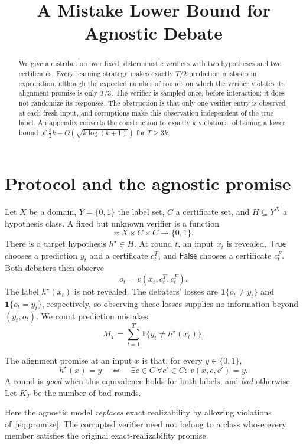 \documentclass[11pt]{article}
\title{A Mistake Lower Bound for Agnostic Debate}
\author{}
\date{}
\newcommand{\ind}{\mathbf{1}}
\newcommand{\True}{\mathsf{True}}
\newcommand{\False}{\mathsf{False}}
\theoremstyle{remark}
\begin{document}
\maketitle
\thispagestyle{plain}
\vspace{-2.2em}
\begin{abstract}
We give a distribution over fixed, deterministic verifiers with two hypotheses
and two certificates. Every learning strategy makes exactly $T/2$ prediction
mistakes in expectation, although the expected number of rounds on which the
verifier violates its alignment promise is only $T/3$. The verifier is sampled
once, before interaction; it does not randomize its responses. The obstruction
is that only one verifier entry is observed at each fresh input, and corruptions
make this observation independent of the true label. An appendix converts the
construction to exactly $k$ violations, obtaining a lower bound of
$\tfrac32 k-O(\sqrt{k\log(k+1)})$ for $T\ge 3k$.
\end{abstract}

\section{Protocol and the agnostic promise}

Let $X$ be a domain, $Y=\{0,1\}$ the label set, $C$ a certificate set, and
$H\subseteq Y^X$ a hypothesis class. A fixed but unknown verifier is a function
\[
    v:X\times C\times C\longrightarrow\{0,1\}.
\]
There is a target hypothesis $h^\star\in H$. At round $t$, an input $x_t$ is
revealed, $\True$ chooses a prediction $y_t$ and a certificate $c_t^T$, and
$\False$ chooses a certificate $c_t^F$. Both debaters then observe
\[
    o_t=v(x_t,c_t^T,c_t^F).
\]
The label $h^\star(x_t)$ is not revealed. The debaters' losses are
$\ind\{o_t\ne y_t\}$ and $\ind\{o_t=y_t\}$, respectively, so observing these
losses supplies no information beyond $(y_t,o_t)$. We count prediction mistakes:
\[
    M_T=\sum_{t=1}^T\ind\{y_t\ne h^\star(x_t)\}.
\]

The alignment promise at an input $x$ is that, for every $y\in\{0,1\}$,
\begin{equation}\label{eq:promise}
 h^\star(x)=y
 \quad\Longleftrightarrow\quad
 \exists c\in C\ \forall c'\in C:\ v(x,c,c')=y.
\end{equation}
A round is \emph{good} when this equivalence holds for both labels, and
\emph{bad} otherwise. Let $K_T$ be the number of bad rounds.

Here the agnostic model \emph{replaces} exact realizability by allowing
violations of~\eqref{eq:promise}. The corrupted verifier need not belong to a
class whose every member satisfies the original exact-realizability promise.
\end{document}
